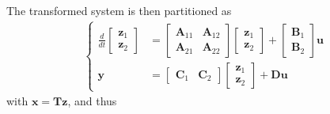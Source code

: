 \documentclass[letterpaper,10pt,english]{jupyterBook}
\begin{document}
\sphinxAtStartPar
{} 

\sphinxAtStartPar
The transformed system is then partitioned as
\begin{equation*}
\begin{split}\left\{
\begin{aligned}
  \frac{d}{dt} \begin{bmatrix} \mathbf{z}_1 \\ \mathbf{z}_2 \end{bmatrix} & = 
               \begin{bmatrix} \mathbf{A}_{11} & \mathbf{A}_{12} \\ \mathbf{A}_{21} & \mathbf{A}_{22} \end{bmatrix}
               \begin{bmatrix} \mathbf{z}_1 \\ \mathbf{z}_2 \end{bmatrix} + 
               \begin{bmatrix} \mathbf{B}_{1} \\ \mathbf{B}_{2} \end{bmatrix} \mathbf{u} \\
\mathbf{y} & = \begin{bmatrix} \mathbf{C}_1 & \mathbf{C}_2 \end{bmatrix} 
               \begin{bmatrix} \mathbf{z}_1 \\ \mathbf{z}_2 \end{bmatrix} + \mathbf{D} \mathbf{u}  
\end{aligned}
\right.\end{split}
\end{equation*}
\sphinxAtStartPar
with \(\mathbf{x} = \mathbf{T} \mathbf{z}\), and thus
\end{document}
